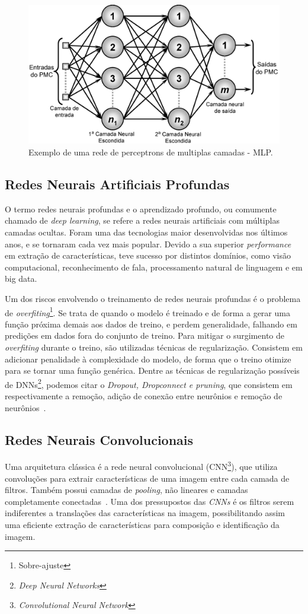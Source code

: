 \begin{figure}[!ht]
    \centering
    \includegraphics[width=0.6\columnwidth]{
        Imagens/RedeNeural.PNG
    }
    \caption{Exemplo de uma rede de perceptrons de multiplas camadas - MLP.}
    \label{fig:ann}
\end{figure}
\subsection{Redes Neurais Artificiais Profundas}\label{sec:Cap2_redes_neurais_profundas}
O termo redes neurais profundas e o aprendizado profundo, ou comumente chamado de \textit{deep learning}, se refere a redes neurais artificiais com múltiplas camadas ocultas. Foram uma das tecnologias maior desenvolvidas nos últimos anos, e se tornaram cada vez mais popular. Devido a sua superior \textit{performance} em extração de características, teve sucesso por distintos domínios, como visão computacional, reconhecimento de fala, processamento natural de linguagem e em big data.

Um dos riscos envolvendo o treinamento de redes neurais profundas é o problema de \textit{overfiting}\footnote{Sobre-ajuste}. Se trata de quando o modelo é treinado e de forma a gerar uma função próxima demais aos dados de treino, e perdem generalidade, falhando em predições em dados fora do conjunto de treino. Para mitigar o surgimento de \textit{overfiting} durante o treino, são utilizadas técnicas de regularização. Consistem em adicionar penalidade à complexidade do modelo, de forma que o treino otimize para se tornar uma função genérica. Dentre as técnicas de regularização possíveis de DNNs\footnote{\textit{Deep Neural Networks}}, podemos citar o \textit{Dropout, Dropconnect e pruning}, que consistem em respectivamente a remoção, adição de conexão entre neurônios e remoção de neurônios~\cite{hastie01statisticallearning}.


\subsection{Redes Neurais Convolucionais}\label{sec:Cap2_redes_neurais_convolucionais}
Uma arquitetura clássica é a rede neural convolucional (CNN\footnote{\textit{Convolutional Neural Network}}), que utiliza convoluções para extrair características de uma imagem entre cada camada de filtros. Também possui camadas de \textit{pooling}, não lineares e camadas completamente conectadas~\cite{8308186}. Uma dos pressupostos das \textit{CNNs} é os filtros serem indiferentes a translações das características na imagem, possibilitando assim uma eficiente extração de características para composição e identificação da imagem.


